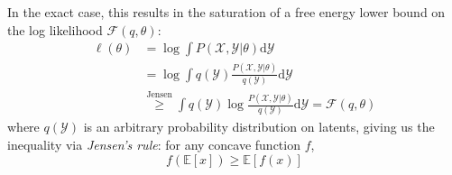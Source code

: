 \documentclass[a4paper]{article}
\begin{document}
In the exact case, this results in the saturation of a free energy lower bound on the log likelihood $\mathcal{F}(q,\theta)$:
\begin{align*}
\ell(\theta) &= \log \int P(\mathcal{X},\mathcal{Y}|\theta) \textrm{d}\mathcal{Y} \\
&= \log \int q(\mathcal{Y}) \frac{P(\mathcal{X},\mathcal{Y}|\theta)}{q(\mathcal{Y})} \textrm{d}\mathcal{Y} \\
&\overset{\text{Jensen}}{\geq} \int q(\mathcal{Y}) \log\frac{P(\mathcal{X},\mathcal{Y}|\theta)}{q(\mathcal{Y})} \textrm{d}\mathcal{Y} = \mathcal{F}(q,\theta)
\end{align*}
where $q(\mathcal{Y})$ is an arbitrary probability distribution on latents, giving us the inequality via \emph{Jensen's rule}: for any concave function $f$,
\[ f(\mathbb{E}[x]) \geq \mathbb{E}[f(x)] \]
\end{document}
